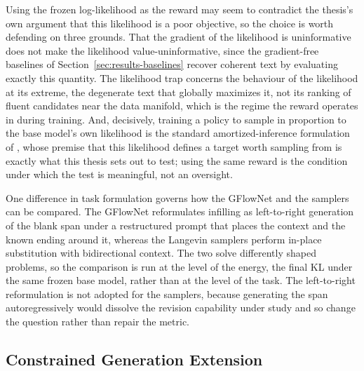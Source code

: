 Using the frozen log-likelihood as the reward may seem to contradict the thesis's own argument that this likelihood is a poor objective, so the choice is worth defending on three grounds. That the gradient of the likelihood is uninformative does not make the likelihood value-uninformative, since the gradient-free baselines of Section~\ref{sec:results-baselines} recover coherent text by evaluating exactly this quantity. The likelihood trap concerns the behaviour of the likelihood at its extreme, the degenerate text that globally maximizes it, not its ranking of fluent candidates near the data manifold, which is the regime the reward operates in during training. And, decisively, training a policy to sample in proportion to the base model's own likelihood is the standard amortized-inference formulation of \citet{hu2024amortizing}, whose premise that this likelihood defines a target worth sampling from is exactly what this thesis sets out to test; using the same reward is the condition under which the test is meaningful, not an oversight.

One difference in task formulation governs how the GFlowNet and the samplers can be compared. The GFlowNet reformulates infilling as left-to-right generation of the blank span under a restructured prompt that places the context and the known ending around it, whereas the Langevin samplers perform in-place substitution with bidirectional context. The two solve differently shaped problems, so the comparison is run at the level of the energy, the final KL under the same frozen base model, rather than at the level of the task. The left-to-right reformulation is not adopted for the samplers, because generating the span autoregressively would dissolve the revision capability under study and so change the question rather than repair the metric.

\subsection{Constrained Generation Extension}
\label{sec:meth-constrained}


